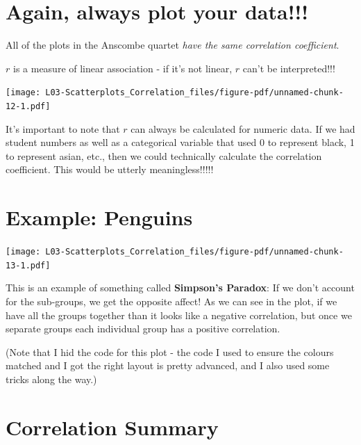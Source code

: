 \documentclass[
  letterpaper,
  DIV=11,
  numbers=noendperiod]{scrreprt}
\begin{document}
\hypertarget{again-always-plot-your-data}{%
\section{Again, always plot your
data!!!}\label{again-always-plot-your-data}}

\vspace{1cm}

All of the plots in the Anscombe quartet \emph{have the same correlation
coefficient}.

\pspace

\(r\) is a measure of linear association - if it's not linear, \(r\)
can't be interpreted!!!

\texttt{[image: L03-Scatterplots\_Correlation\_files/figure-pdf/unnamed-chunk-12-1.pdf]}

It's important to note that \(r\) can always be calculated for numeric
data. If we had student numbers as well as a categorical variable that
used 0 to represent black, 1 to represent asian, etc., then we could
technically calculate the correlation coefficient. This would be utterly
meaningless!!!!!

\hypertarget{example-penguins}{%
\section{Example: Penguins}\label{example-penguins}}

\texttt{[image: L03-Scatterplots\_Correlation\_files/figure-pdf/unnamed-chunk-13-1.pdf]}

This is an example of something called \textbf{Simpson's Paradox}: If we
don't account for the sub-groups, we get the opposite affect! As we can
see in the plot, if we have all the groups together than it looks like a
negative correlation, but once we separate groups each individual group
has a positive correlation.

(Note that I hid the code for this plot - the code I used to ensure the
colours matched and I got the right layout is pretty advanced, and I
also used some tricks along the way.)

\hypertarget{correlation-summary}{%
\section{Correlation Summary}\label{correlation-summary}}
\end{document}
